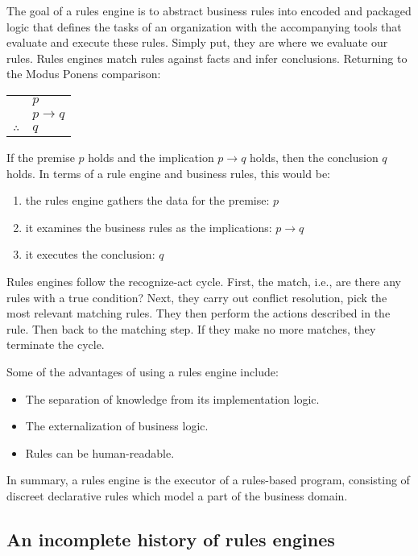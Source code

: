 The goal of a rules engine is to abstract business rules into encoded and packaged logic that defines the tasks of an organization with the accompanying tools that evaluate and execute these rules.
Simply put, they are where we evaluate our rules.
Rules engines match rules against facts and infer conclusions.
Returning to the Modus Ponens comparison:

\begin{tabular}{c@{\,}l@{}} 
    & $p$ \\
\arrayrulecolor{blue!60!green!70}    & $p \to q$ \\\cline{2-2}
$\therefore$         & $q$ \\
\end{tabular}

If the premise $p$ holds and the implication $p \to q$ holds, then the conclusion $q$ holds.
In terms of a rule engine and business rules, this would be:
\begin{enumerate}
    \setlength\itemsep{0em}
    \item the rules engine gathers the data for the premise: $p$
    \item it examines the business rules as the implications: $p \to q$
    \item it executes the conclusion: $q$
\end{enumerate}

Rules engines follow the recognize-act cycle.
First, the match, i.e., are there any rules with a true condition?
Next, they carry out conflict resolution, pick the most relevant matching rules.
They then perform the actions described in the rule.
Then back to the matching step.
If they make no more matches, they terminate the cycle.

Some of the advantages of using a rules engine include:
\begin{itemize}
    \setlength\itemsep{0em}
    \item The separation of knowledge from its implementation logic.
    \item The externalization of business logic.
    \item Rules can be human-readable.
\end{itemize}

In summary, a rules engine is the executor of a rules-based program, consisting of discreet declarative rules which model a part of the business domain.

\subsection{An incomplete history of rules engines}

